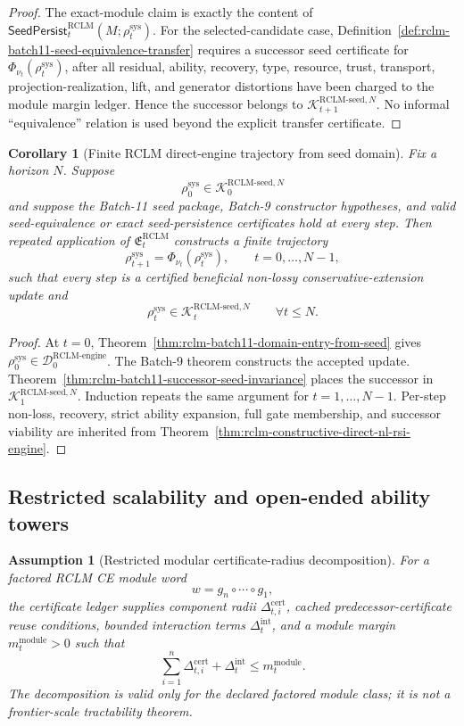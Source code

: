 \documentclass[11pt,a4paper]{article}
\newtheorem{corollary}[theorem]{Corollary}
\newtheorem{assumption}[theorem]{Assumption}
\newcommand{\Kcal}{\mathcal K}
\newcommand{\Dcal}{\mathcal D}
\newcommand{\RCLM}{\mathrm{RCLM}}
\newcommand{\sys}{\mathrm{sys}}
\newcommand{\cert}{\mathrm{cert}}
\newcommand{\engine}{\mathrm{engine}}
\begin{document}
\begin{proof}
The exact-module claim is exactly the content of \(\mathsf{SeedPersist}_t^{\RCLM}(M;\rho_t^{\sys})\).  For the selected-candidate case, Definition~\ref{def:rclm-batch11-seed-equivalence-transfer} requires a successor seed certificate for \(\Phi_{\nu_t}(\rho_t^{\sys})\), after all residual, ability, recovery, type, resource, trust, transport, projection-realization, lift, and generator distortions have been charged to the module margin ledger.  Hence the successor belongs to \(\Kcal_{t+1}^{\RCLM\text{-}\mathrm{seed},N}\).  No informal ``equivalence'' relation is used beyond the explicit transfer certificate.
\end{proof}

\begin{corollary}[Finite RCLM direct-engine trajectory from seed domain]
\label{cor:rclm-batch11-finite-seed-trajectory}
Fix a horizon \(N\).  Suppose
\[
\rho_0^{\sys}\in\Kcal_0^{\RCLM\text{-}\mathrm{seed},N}
\]
and suppose the Batch-11 seed package, Batch-9 constructor hypotheses, and valid seed-equivalence or exact seed-persistence certificates hold at every step.  Then repeated application of \(\mathfrak E_t^{\RCLM}\) constructs a finite trajectory
\[
\rho_{t+1}^{\sys}=\Phi_{\nu_t}(\rho_t^{\sys}),
\qquad t=0,\ldots,N-1,
\]
such that every step is a certified beneficial non-lossy conservative-extension update and
\[
\rho_t^{\sys}\in\Kcal_t^{\RCLM\text{-}\mathrm{seed},N}
\qquad\forall t\le N.
\]
\end{corollary}

\begin{proof}
At \(t=0\), Theorem~\ref{thm:rclm-batch11-domain-entry-from-seed} gives \(\rho_0^{\sys}\in\Dcal_0^{\RCLM\text{-}\engine}\).  The Batch-9 theorem constructs the accepted update.  Theorem~\ref{thm:rclm-batch11-successor-seed-invariance} places the successor in \(\Kcal_1^{\RCLM\text{-}\mathrm{seed},N}\).  Induction repeats the same argument for \(t=1,\ldots,N-1\).  Per-step non-loss, recovery, strict ability expansion, full gate membership, and successor viability are inherited from Theorem~\ref{thm:rclm-constructive-direct-nl-rsi-engine}.
\end{proof}

\subsection{Restricted scalability and open-ended ability towers}

\begin{assumption}[Restricted modular certificate-radius decomposition]
\label{ass:rclm-batch11-modular-cert-radius-decomposition}
For a factored RCLM CE module word
\[
w=g_n\circ\cdots\circ g_1,
\]
the certificate ledger supplies component radii \(\Delta_{t,i}^{\cert}\), cached predecessor-certificate reuse conditions, bounded interaction terms \(\Delta_{t}^{\mathrm{int}}\), and a module margin \(m_t^{\mathrm{module}}>0\) such that
\[
\sum_{i=1}^n \Delta_{t,i}^{\cert}+\Delta_t^{\mathrm{int}}
\le
m_t^{\mathrm{module}}.
\]
The decomposition is valid only for the declared factored module class; it is not a frontier-scale tractability theorem.
\end{assumption}
\end{document}

